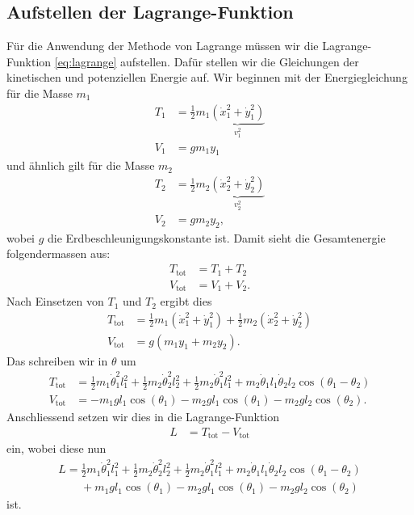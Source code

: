 \subsection{Aufstellen der Lagrange-Funktion}
Für die Anwendung der Methode von Lagrange müssen wir die Lagrange-Funktion 
\eqref{eq:lagrange} aufstellen.
Dafür stellen wir die Gleichungen der kinetischen und potenziellen Energie auf.
Wir beginnen mit der Energiegleichung für die Masse \(m_1\)
\begin{align*}
    T_1 &= \frac{1}{2} m_1 
    \underbrace{( \dot{x}_1^2 + \dot{y}_1^2 )}_{\displaystyle v_1^2}\\
    V_1 &= g m_1 y_1
\end{align*}
und ähnlich gilt für die Masse \(m_2\)
\begin{align*}
    T_2 &= \frac{1}{2} m_2 
    \underbrace{( \dot{x}_2^2 + \dot{y}_2^2 )}_{\displaystyle v_2^2}\\
    V_2 &= g m_2 y_2,
\end{align*}
wobei \(g\) die Erdbeschleunigungskonstante ist.
Damit sieht die Gesamtenergie folgendermassen aus:
\begin{align*}
    T_{\text{tot}} &= T_1 + T_2\\
    V_{\text{tot}} &= V_1 + V_2.
\end{align*}
Nach Einsetzen von \(T_1\) und \(T_2\) ergibt dies
\begin{align*}
    T_{\text{tot}} &= \frac{1}{2} m_1 ( \dot{x}_1^2 + \dot{y}_1^2 ) +
    \frac{1}{2} m_2 ( \dot{x}_2^2 + \dot{y}_2^2 )\\
    V_{\text{tot}} &= g ( m_1 y_1 + m_2 y_2 ).
\end{align*}
Das schreiben wir in \(\theta\) um
\begin{align*}
    T_{\text{tot}} &= \frac{1}{2} m_1 \dot{\theta}^2_1 l_1^2 + 
    \frac{1}{2} m_2 \dot{\theta}^2_2 l_2^2 + \frac{1}{2}
    m_2 \dot{\theta}^2_1 l_1^2 + 
    m_2 \dot{\theta}_1 l_1 \dot{\theta}_2 l_2 
    \cos(\theta_1 - \theta_2)\\
    V_{\text{tot}} &= -m_1 g l_1 \cos(\theta_1) -
    m_2 g l_1 \cos(\theta_1) -
    m_2 g l_2 \cos(\theta_2).
\end{align*}
Anschliessend setzen wir dies in die Lagrange-Funktion
\begin{align*}
    L &= T_{\text{tot}} - V_{\text{tot}}
\end{align*}
ein, wobei diese nun
\begin{align*}
    L = \frac{1}{2} m_1 \dot{\theta}^2_1 l_1^2 + 
    \frac{1}{2} m_2 \dot{\theta}^2_2 l_2^2 + \frac{1}{2}
    m_2 \dot{\theta}^2_1 l_1^2 + 
    m_2 \dot{\theta}_1 l_1 \dot{\theta}_2 l_2 
    \cos(\theta_1 - \theta_2)\\ \nonumber
    \qquad + m_1 g l_1 \cos(\theta_1) -
    m_2 g l_1 \cos(\theta_1) -
    m_2 g l_2 \cos(\theta_2)
\end{align*}
ist.

